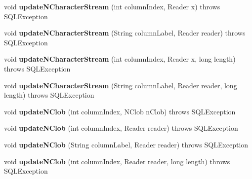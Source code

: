 \begin{DoxyCompactItemize}
void {\bfseries update\+N\+Character\+Stream} (int column\+Index, Reader x)  throws S\+Q\+L\+Exception 
\item 
\mbox{\label{classcom_1_1mysql_1_1jdbc_1_1_j_d_b_c4_result_set_a301d0410a8f9ddba3d7fcc829fa26e52}} 
void {\bfseries update\+N\+Character\+Stream} (String column\+Label, Reader reader)  throws S\+Q\+L\+Exception 
\item 
\mbox{\label{classcom_1_1mysql_1_1jdbc_1_1_j_d_b_c4_result_set_a1ba37f8ec7db44d5fa5d1ea125fcd2c6}} 
void {\bfseries update\+N\+Character\+Stream} (int column\+Index, Reader x, long length)  throws S\+Q\+L\+Exception 
\item 
\mbox{\label{classcom_1_1mysql_1_1jdbc_1_1_j_d_b_c4_result_set_ab10cc566c38fcbc60a53ce3b17c79858}} 
void {\bfseries update\+N\+Character\+Stream} (String column\+Label, Reader reader, long length)  throws S\+Q\+L\+Exception 
\item 
\mbox{\label{classcom_1_1mysql_1_1jdbc_1_1_j_d_b_c4_result_set_aaac3403912c74748aa7a2d6ea0a2e8e6}} 
void {\bfseries update\+N\+Clob} (int column\+Index, N\+Clob n\+Clob)  throws S\+Q\+L\+Exception 
\item 
\mbox{\label{classcom_1_1mysql_1_1jdbc_1_1_j_d_b_c4_result_set_ac34a2dcfce257cd20316fac01887e3ff}} 
void {\bfseries update\+N\+Clob} (int column\+Index, Reader reader)  throws S\+Q\+L\+Exception 
\item 
\mbox{\label{classcom_1_1mysql_1_1jdbc_1_1_j_d_b_c4_result_set_ade72d03fa9a40b22f6d332559124ef20}} 
void {\bfseries update\+N\+Clob} (String column\+Label, Reader reader)  throws S\+Q\+L\+Exception 
\item 
\mbox{\label{classcom_1_1mysql_1_1jdbc_1_1_j_d_b_c4_result_set_aa5a0e42ed1f5dfe544268c616fd3c96f}} 
void {\bfseries update\+N\+Clob} (int column\+Index, Reader reader, long length)  throws S\+Q\+L\+Exception 
\item 

\end{DoxyCompactItemize}
